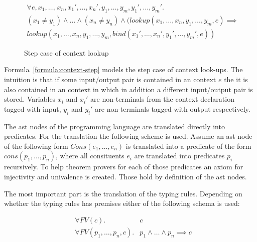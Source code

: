 \begin{figure}
\begin{multline}
  \forall e, x_1, \dots, x_n, x_1', \dots, x_n', y_1, \dots, y_m,
  y_1', \dots,
  y_m' . \\
  (x_1 \neq y_1) \land \dots \land (x_n \neq y_n) \land (lookup(x_1,
  \dots, x_n, y_1, \dots, y_m, e) \implies \\ lookup(x_1, \dots, x_n,
  y_1, \dots, y_m, bind(x_1',\dots,x_n',y_1',\dots,y_m',e))
\label{formula:context-step}
\end{multline}
\caption{Step case of context lookup}
\end{figure}

Formula~\ref{formula:context-step} models the step case of
context look-ups. The intuition is that if some input/output pair
is contained in an context $e$ the it is also contained in an
context in which in addition a different input/output pair is
stored. Variables $x_i$ and $x_i'$ are non-terminals from the
context declaration tagged with input, $y_i$ and $y_i'$ are
non-terminals tagged with output respectively.

The \gls{ast} nodes of the programming language are translated directly into
predicates. For the translation the following scheme is used. Assume
an \gls{ast} node of the following form $Cons(e_1, \dots, e_n)$ is
translated into a predicate of the form $cons(p_1, \dots, p_n)$, where
all consituents $e_i$ are translated into predicates $p_i$
recursively. To help theorem provers for each of those predicates an
axiom for injectivity and univalence is created. Those hold by
definition of the \gls{ast} nodes.

The most important part is the translation of the typing
rules. Depending on whether the typing rules has premises either of
the following schema is used:

\begin{figure}
\label{formula:typing-rule}
\begin{align}
  &\forall FV(c) .& c \\
  &\forall FV(p_1,\dots, p_n, c) .& p_1 \land \dots \land p_n \implies c
\end{align}
\end{figure}

